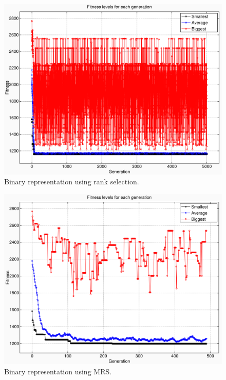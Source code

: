 \documentclass[10pt,a4paper,openbib]{article}
\begin{document}
\begin{multicols}{2}
\begin{figure}[H]
\begin{center}
\includegraphics[scale=0.4]{images/result4/GraphBinaryfalse0.png} 
\caption{Binary representation using rank selection.}
\label{fig:cities20GraphBinaryfalse}
\end{center}
\end{figure}

\begin{figure}[H]
\begin{center}
\includegraphics[scale=0.4]{images/result4/GraphBinarytrue2.png} 
\caption{Binary representation using  MRS.}
\label{fig:cities20GraphBinarytrue}
\end{center}
\end{figure}



\end{multicols}
\end{document}

